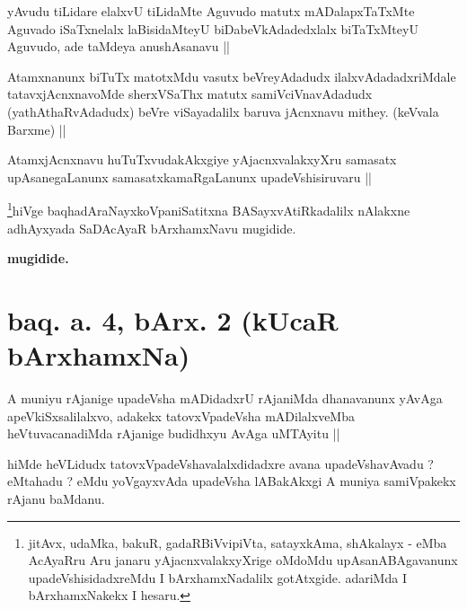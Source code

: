 
\begin{artha}
yAvudu tiLidare elalxvU tiLidaMte Aguvudo matutx mADalapxTaTxMte Aguvado iSaTxnelalx laBisidaMteyU biDabeVkAdadedxlalx biTaTxMteyU Aguvudo, ade taMdeya anushAsanavu ||
\end{artha}


\begin{artha}
Atamxnanunx biTuTx matotxMdu vasutx beVreyAdadudx ilalxvAdadadxriMdale tatavxjAcnxnavoMde sherxVSaThx matutx samiVciVnavAdadudx (yathAthaRvAdadudx) beVre viSayadalilx baruva jAcnxnavu mithey. (keVvala Barxme) ||
\end{artha}


\begin{artha}
AtamxjAcnxnavu huTuTxvudakAkxgiye yAjacnxvalakxyXru samasatx upAsanegaLanunx samasatxkamaRgaLanunx upadeVshisiruvaru ||
\end{artha}

\begin{artha}
\footnote{jitAvx, udaMka, bakuR, gadaRBiVvipiVta, satayxkAma, shAkalayx - eMba AcAyaRru Aru janaru yAjacnxvalakxyXrige oMdoMdu upAsanABAgavanunx upadeVshisidadxreMdu I bArxhamxNadalilx gotAtxgide. adariMda I bArxhamxNakekx I hesaru.}hiVge baqhadAraNayxkoVpaniSatitxna BASayxvAtiRkadalilx nAlakxne adhAyxyada SaDAcAyaR bArxhamxNavu mugidide.
\end{artha}

\begin{center}
{\bf mugidide.}
\end{center}

\section*{baq. a. 4, bArx. 2 (kUcaR bArxhamxNa)}

\begin{artha}
A muniyu rAjanige upadeVsha mADidadxrU rAjaniMda dhanavanunx yAvAga apeVkiSxsalilalxvo, adakekx tatovxVpadeVsha mADilalxveMba heVtuvacanadiMda rAjanige budidhxyu AvAga uMTAyitu ||
\end{artha}

\begin{artha}
hiMde heVLidudx tatovxVpadeVshavalalxdidadxre avana upadeVshavAvadu ? eMtahadu ? eMdu yoVgayxvAda upadeVsha lABakAkxgi A muniya samiVpakekx rAjanu baMdanu.
\end{artha}

